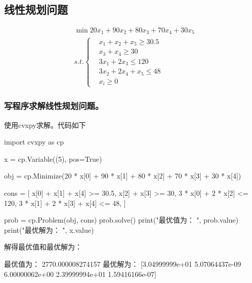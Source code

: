 \chapter{}
\section{线性规划问题}

\begin{equation}
    \begin{aligned}
        & \min 20x_1+90x_2+80x_3+70x_4+30x_5\\
        & s.t. \left \{
            \begin{aligned}
                & x_1 + x_2 + x_5 \ge 30.5\\
                & x_3+x_4 \ge 30\\
                & 3x_1+2x_3 \le 120\\
                & 3x_2 + 2x_4 +x_5 \le 48\\
                & x_i \ge 0
            \end{aligned}
            \right .
    \end{aligned}
\end{equation}

\subsection{写程序求解线性规划问题。}
使用cvxpy求解。代码如下

\begin{python}
    import cvxpy as cp

    x = cp.Variable((5), pos=True)

    obj = cp.Minimize(20 * x[0] + 90 * x[1] + 80 * x[2] + 70 * x[3] + 30 * x[4])

    cons = [
        x[0] + x[1] + x[4] >= 30.5,
        x[2] + x[3] >= 30,
        3 * x[0] + 2 * x[2] <= 120,
        3 * x[1] + 2 * x[3] + x[4] <= 48,
    ]

    prob = cp.Problem(obj, cons)
    prob.solve()
    print("最优值为： ", prob.value)
    print("最优解为： ", x.value)
\end{python}


解得最优值和最优解为：
\begin{python}
    最优值为：  2770.000008274157
    最优解为：  [3.04999999e+01 
                5.07064437e-09 
                6.00000062e+00 
                2.39999994e+01
                1.59416166e-07]
\end{python}

